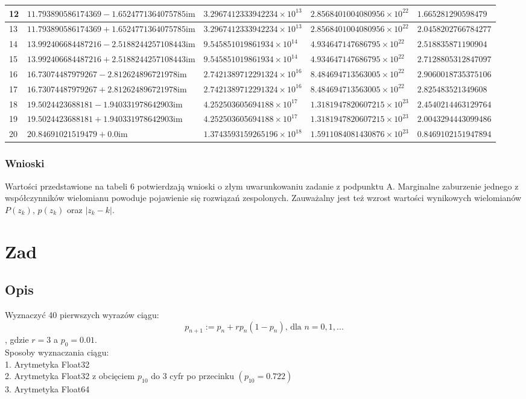 \documentclass[10pt,a4paper, polish]{article}
\begin{document}
\begin{table}[H]
\begin{tabular}{|p{0.1cm}|p{3.2cm}|p{3.2cm}|p{3.2cm}|p{3.2cm}|}
\hline
12 & $11.793890586174369 - 1.6524771364075785\text{im}$ & $3.2967412333942234\times 10^{13}$ & $2.8568401004080956\times 10^{22}$ & $1.665281290598479$ \\
\hline
13 & $11.793890586174369 + 1.6524771364075785\text{im}$ & $3.2967412333942234\times 10^{13}$ & $2.8568401004080956\times 10^{22}$ & $2.0458202766784277$ \\
\hline
14 & $13.992406684487216 - 2.5188244257108443\text{im}$ & $9.545851019861934\times 10^{14}$ & $4.934647147686795\times 10^{22}$ & $2.518835871190904$ \\
\hline
15 & $13.992406684487216 + 2.5188244257108443\text{im}$ & $9.545851019861934\times 10^{14}$ & $4.934647147686795\times 10^{22}$ & $2.7128805312847097$ \\
\hline
16 & $16.73074487979267 - 2.812624896721978\text{im}$ & $2.7421389712291324\times 10^{16}$ & $8.484694713563005\times 10^{22}$ & $2.9060018735375106$ \\
\hline
17 & $16.73074487979267 + 2.812624896721978\text{im}$ & $2.7421389712291324\times 10^{16}$ & $8.484694713563005\times 10^{22}$ & $2.825483521349608$ \\
\hline
18 & $19.5024423688181 - 1.940331978642903\text{im}$ & $4.252503605694188\times 10^{17}$ & $1.3181947820607215\times 10^{23}$ & $2.4540214463129764$ \\
\hline
19 & $19.5024423688181 + 1.940331978642903\text{im}$ & $4.252503605694188\times 10^{17}$ & $1.3181947820607215\times 10^{23}$ & $2.0043294443099486$ \\
\hline
20 & $20.84691021519479 + 0.0\text{im}$ & $1.3743593159265196\times 10^{18}$ & $1.5911084081430876\times 10^{23}$ & $0.8469102151947894$ \\
\hline
\end{tabular}
\end{table}
\subsubsection*{Wnioski}
Wartości przedstawione na tabeli 6 potwierdzają wnioski o złym uwarunkowaniu zadanie z podpunktu A. Marginalne zaburzenie jednego z współczynników wielomianu powoduje pojawienie się rozwiązań zespolonych. Zauważalny jest też wzrost wartości wynikowych wielomianów $P(z_k)$, $p(z_k)$ oraz $|z_k - k|$.
\section{Zad}
\subsection*{Opis}
Wyznaczyć 40 pierwszych wyrazów ciągu:
$$ p_{n+1} := p_n + rp_n(1-p_n)\text{, dla }n = 0,1,...$$, gdzie $r = 3$ a $p_0 = 0.01$.\\
Sposoby wyznaczania ciągu:\\
1. Arytmetyka Float32\\
2. Arytmetyka Float32 z obcięciem $p_{10}$ do 3 cyfr po przecinku $(p_{10} = 0.722)$\\
3. Arytmetyka Float64
\end{document}
